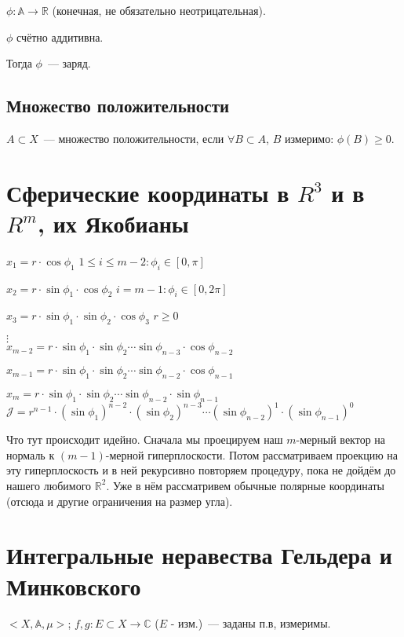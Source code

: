 \documentclass[paper=a4, fontsize=17pt]{article}
\begin{document}
	$\phi: \mathds{A} \to \mathds{R}$ (конечная, не обязательно неотрицательная).

	$\phi$ счётно аддитивна.

	Тогда $\phi$~--- заряд.

	\subsection{Множество положительности}
	$A \subset X$~--- множество положительности, если
	$\forall B \subset A$, $B$ измеримо: $\phi(B) \geq 0$.

	\section{Сферические координаты в $ R^3 $ и в $ R^m $, их Якобианы}
	$x_1 = r \cdot \cos \phi_1$
    \hfill
	$1 \leq i \leq m-2: \phi_i \in [0,\pi]$

	$x_2 = r \cdot \sin \phi_1 \cdot \cos \phi_2$
    \hfill
	$i=m-1: \phi_i \in [0,2\pi]$

	$x_3 = r \cdot \sin \phi_1 \cdot \sin \phi_2 \cdot \cos \phi_3$
    \hfill
    $r \geq 0$

    $\vdots$\\
	$x_{m-2} = r \cdot \sin \phi_1 \cdot \sin \phi_2 \cdots \sin \phi_{n-3} \cdot \cos \phi_{n-2}$

	$x_{m-1} = r \cdot \sin \phi_1 \cdot \sin \phi_2 \cdots \sin \phi_{n-2} \cdot \cos \phi_{n-1}$


	$x_{m} = r \cdot \sin \phi_1 \cdot \sin \phi_2 \cdots \sin \phi_{n-2} \cdot \sin \phi_{n-1}$\\

	$\mathcal{J} = r^{n-1} \cdot (\sin \phi_1)^{n-2} \cdot (\sin \phi_2)^{n-3} \cdots (\sin \phi_{n-2})^{1} \cdot (\sin \phi_{n-1})^{0}$

	Что тут происходит идейно. Сначала мы проецируем наш $m$-мерный вектор на нормаль к $(m-1)$-мерной гиперплоскости. Потом рассматриваем проекцию на эту гиперплоскость и в ней рекурсивно повторяем процедуру, пока не дойдём до нашего любимого $\mathds{R}^2$. Уже в нём рассматривем обычные полярные координаты (отсюда и другие ограничения на размер угла).

	\section{Интегральные неравества Гельдера и Минковского}
	$<X, \mathds{A}, \mu>$; $f, g : E \subset X \rightarrow \mathds{C}$ ($E$ - изм.)~--- заданы п.в, измеримы.\\
\end{document}
